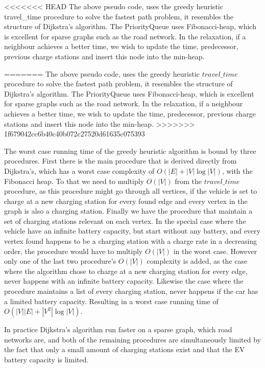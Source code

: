 <<<<<<< HEAD
The above pseudo code, uses the greedy heuristic travel\_time procedure to solve the fastest path problem, it resembles the structure of Dijkstra's algorithm. The PriorityQueue uses Fibonacci-heap, which is excellent for sparse graphs such as the road network. In the relaxation, if a neighbour achieves a better time, we wish to update the time, predecessor, previous charge stations and insert this node into the min-heap.

=======
The above pseudo code, uses the greedy heuristic $travel\_time$ procedure to solve the fastest path problem, it resembles the structure of Dijkstra's algorithm. The PriorityQueue uses Fibonacci-heap, which is excellent for sparse graphs such as the road network. In the relaxation, if a neighbour achieves a better time, we wish to update the time, predecessor, previous charge stations and insert this node into the min-heap.
>>>>>>> 1f679042cc6b40c40b072c27520d61635c075393

The worst case running time of the greedy heuristic algorithm is bound by three procedures. First there is the main procedure that is derived directly from Dijkstra's, which has a worst case complexity of $O(|E|+|V|\log|V|)$, with the Fibonacci heap. To that we need to multiply $O(|V|)$ from the $travel\_time$ procedure, as this procedure might go through all vertices, if the vehicle is set to charge at a new charging station for every found edge and every vertex in the graph is also a charging station. Finally we have the procedure that maintain a set of charging stations relevant on each vertex. In the special case where the vehicle have an infinite battery capacity, but start without any battery, and every vertex found happens to be a charging station with a charge rate in a decreasing order, the procedure would have to multiply $O(|V|)$ in the worst case.
However only one of the last two procedure's $O(|V|)$ complexity is added, as the case where the algorithm chose to charge at a new charging station for every edge, never happens with an infinite battery capacity. Likewise the case where the procedure maintains a list of every charging station, never happens if the car has a limited battery capacity. Resulting in a worst case running time of $O(|V||E|+|V^2|\log|V|)$. %


In practice Dijkstra's algorithm run faster on a sparse graph, which road networks are, and both of the remaining procedures are simultaneously limited by the fact that only a small amount of charging stations exist and that the EV battery capacity is limited.